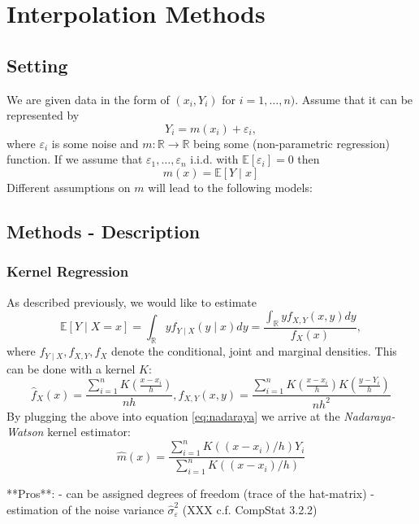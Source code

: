 \chapter{Interpolation Methods}

\section{Setting}

We are given data in the form of $\left(x_{i}, Y_{i}\right)$ for $i=1, \ldots, n)$. Assume that it can be represented by
$$
    Y_{i}=m\left(x_{i}\right)+\varepsilon_{i},
$$
where $\varepsilon_i$ is some noise and $m: \mathbb{R} \rightarrow \mathbb{R}$ being some (non-parametric regression) function. If we assume that $\varepsilon_{1}, \ldots, \varepsilon_{n}$ i.i.d. with $\mathbb{E}\left[\varepsilon_{i}\right]=0$ then $$m(x)=\mathbb{E}[Y \mid x]$$
Different assumptions on $m$ will lead to the following models:



\section{Methods - Description}

\subsection{Kernel Regression}
\label{sec:Kernel}
As described previously, we would like to estimate
\begin{equation}
    \label{eq:nadaraya}
    \mathbb{E}[Y \mid X=x]
    = \int_{\mathbb{R}} y f_{Y \mid X}(y \mid x) d y
    =\frac{\int_{\mathbb{R}} y f_{X, Y}(x, y) d y}{f_{X}(x)},
\end{equation}
where $f_{Y \mid X}, f_{X, Y}, f_{X}$ denote the conditional, joint and marginal densities.
This can be done with a kernel $K$:
$$
    \hat{f}_{X}(x)=\frac{\sum_{i=1}^{n} K\left(\frac{x-x_{i}}{h}\right)}{n h}, \hat{f}_{X, Y}(x, y)=\frac{\sum_{i=1}^{n} K\left(\frac{x-x_{i}}{h}\right) K\left(\frac{y-Y_{i}}{h}\right)}{n h^{2}}
$$
By plugging the above into equation \ref{eq:nadaraya} we arrive at the \textit{Nadaraya-Watson} kernel estimator:
$$\hat{m}(x)=\frac{\sum_{i=1}^{n} K\left(\left(x-x_{i}\right) / h\right) Y_{i}}{\sum_{i=1}^{n} K\left(\left(x-x_{i}\right) / h\right)}$$

**Pros**:
- can be assigned degrees of freedom (trace of the hat-matrix)
- estimation of the noise variance $\hat \sigma_\varepsilon^2$ (XXX c.f. CompStat 3.2.2)

